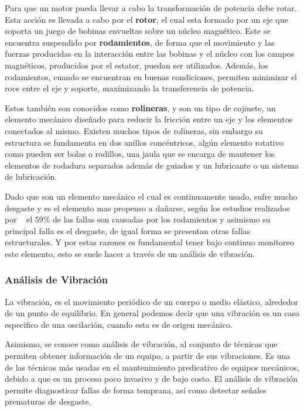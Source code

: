 Para que un motor pueda llevar a cabo la transformación de potencia debe rotar.
Esta acción es llevada a cabo por el \textbf{rotor}, el cual esta formado por un
eje que soporta un juego de bobinas envueltas sobre un núcleo magnético. Este
se encuentra suspendido por \textbf{rodamientos}, de forma que el movimiento y
las fuerzas producidas en la interacción entre las bobinas y el núcleo con los
campos magnéticos, producidos por el estator, puedan ser utilizados. Además,
los rodamientos, cuando se encuentran en buenas condiciones, permiten minimizar
el roce entre el eje y soporte, maximizando la transferencia de potencia.

Estos también son conocidos como \textbf{rolineras}, y son un tipo de cojinete,
un elemento mecánico diseñado para reducir la fricción entre un eje y los
elementos conectados al mismo. Existen muchos tipos de rolineras, sin embargo
su estructura se fundamenta en dos anillos concéntricos, algún elemento rotativo
como pueden ser bolas o rodillos, una jaula que se encarga de mantener los
elementos de rodadura separados además de guiados y un lubricante o un sistema
de lubricación.

Dado que son un elemento mecánico el cual es continuamente usado, sufre mucho
desgaste y es el elemento mas propenso a dañarse, según los estudios realizados
por ~\textcite{Kammermann} el 59\% de las fallas son causadas por los rodamientos
y asimismo su principal falla es el desgaste, de igual forma se presentan
otras fallas estructurales. Y por estas razones es fundamental tener bajo continuo
monitoreo este elemento, esto se suele hacer a través de un análisis de vibración.


\subsubsection{Análisis de Vibración}

La vibración, es el  movimiento periódico de un cuerpo o medio
elástico, alrededor de un punto de equilibrio. En general podemos decir que una
vibración es un caso especifico de una oscilación, cuando esta es de origen
mecánico.

Asimismo, se conoce como análisis de vibración, al conjunto de técnicas que permiten
obtener información de un equipo, a partir de sus vibraciones. Es una de las
técnicas más usadas en el mantenimiento predicativo de equipos mecánicos, debido
a que es un proceso poco invasivo y de bajo costo. El análisis de vibración
permite diagnosticar fallas de forma temprana, así como detectar señales
prematuras de desgaste.

